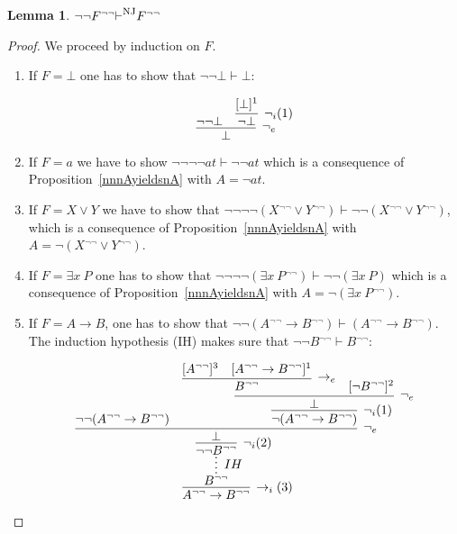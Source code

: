 \documentclass[english]{smfart}
\theoremstyle{plain}
\newtheorem{lemma}[theorem]{Lemma}
\begin{document}
\begin{lemma}
 $\lnot\lnot F{^{\lnot\lnot}}{\vdash}^{\mbox{\textsc{nj}}} F{^{\lnot\lnot}}$
\label{lemme} 
\end{lemma} 

\begin{proof}
We proceed by induction on $F$. 

\begin{enumerate}
\item If $F=\bot$ one has to show that  $\lnot\lnot \bot {\vdash} \bot$: 

$$\infer[\lnot_e]{\bot}{
   \lnot\lnot \bot
 & \infer[\lnot_i(1)]{\lnot \bot}{    [\bot]^1   }
}
$$

\item If $F=a$ we have to show $\lnot\lnot\lnot\lnot at {\vdash}
  \lnot\lnot at$ which is a consequence of Proposition~\ref{nnnAyieldsnA} with $A=\lnot at$. 

\item  If $F=X\lor Y$ we have to show that $\lnot\lnot\lnot\lnot(X{^{\lnot\lnot}}
  \lor Y{^{\lnot\lnot}}) {\vdash} \lnot\lnot(X{^{\lnot\lnot}} \lor Y{^{\lnot\lnot}})$, which  is a consequence
  of Proposition~\ref{nnnAyieldsnA} with $A=\lnot(X{^{\lnot\lnot}} \lor Y{^{\lnot\lnot}})$. 

\item If $F=\exists x\ P$ one has to show that
  $\lnot\lnot\lnot\lnot(\exists x\ P{^{\lnot\lnot}}) {\vdash} \lnot\lnot(\exists x\ P)$ which  is a consequence of Proposition~\ref{nnnAyieldsnA} with $A=\lnot(\exists x\ P{^{\lnot\lnot}})$. 

\item If $F=A \rightarrow B$, one has to show that $ \lnot\lnot (A{^{\lnot\lnot}} \rightarrow B{^{\lnot\lnot}}){\vdash} (A{^{\lnot\lnot}} \rightarrow B{^{\lnot\lnot}})$.  The induction hypothesis (IH) makes sure that 
 $\lnot\lnot B{^{\lnot\lnot}} {\vdash} B{^{\lnot\lnot}}$: 

$$\infer[\rightarrow_i(3)]{A{^{\lnot\lnot}} \rightarrow B{^{\lnot\lnot}}}{
   \infer*[IH]{B{^{\lnot\lnot}}}{
      \infer[\lnot_i(2)]{\lnot\lnot B{^{\lnot\lnot}}}{
           \infer[\lnot_e]{\bot}{
              \lnot\lnot (A{^{\lnot\lnot}} \rightarrow B{^{\lnot\lnot}})
            & \infer[\lnot_i(1)]{\lnot (A{^{\lnot\lnot}} \rightarrow B{^{\lnot\lnot}})}{
                 \infer[\lnot_e]{\bot}{
                    \infer[\rightarrow_e]{B{^{\lnot\lnot}}}{
                       [A{^{\lnot\lnot}}]^3
                     & [A{^{\lnot\lnot}} \rightarrow B{^{\lnot\lnot}}]^1
                    }
                  & [\lnot B{^{\lnot\lnot}}]^2
                 }
              }
          }
      }
   }
}
$$


\end{enumerate}
\end{proof}
\end{document}
